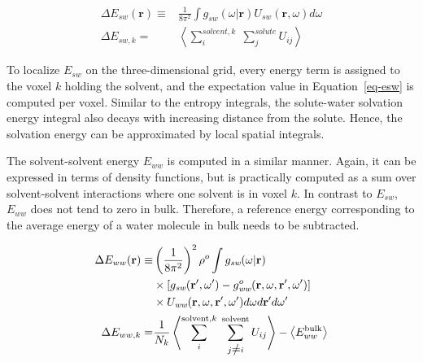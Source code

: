 \documentclass[9pt,tutorial]{livecoms}
\renewcommand{\neq}{\setbox0\hbox{=}\rlap{\hbox to \wd0{\hss /\hss}}\box0}
\begin{document}
\begin{equation}
\begin{aligned}
\label{eq-esw}
	\Delta E_{sw}(\textbf{r}) \equiv& \frac{1}{8\pi^2} \int g_\textit{sw}\left(\omega|\textbf{r}\right) U_\textit{sw}\left(\textbf{r}, \omega\right) d\omega \\
	\Delta E_{sw,k}=& \left\langle \sum_i^{\textit{solvent},k} \; \sum_j^\textit{solute} U_{ij}\right\rangle
\end{aligned}
\end{equation}

To localize $E_{sw}$ on the three-dimensional grid, every energy term is assigned to the voxel $k$ holding the solvent, and the expectation value in Equation~\ref{eq-esw} is computed per voxel.
Similar to the entropy integrals, the solute-water solvation energy integral also decays with increasing distance from the solute. Hence, the solvation energy can be approximated by local spatial integrals. 

The solvent-solvent energy $E_{ww}$ is computed in a similar manner.
Again, it can be expressed in terms of density functions, but is practically computed as a sum over solvent-solvent interactions where one solvent is in voxel $k$.
In contrast to $E_{sw}$, $E_{ww}$ does not tend to zero in bulk.
Therefore, a reference energy corresponding to the average energy of a water molecule in bulk needs to be subtracted.


\begin{equation}
\begin{aligned}
	\Delta E_{ww}(\textbf{r}) \equiv & \left(\frac{1}{8\pi^2} \right)^2 \rho^o \int g_\textit{sw}(\omega|\textbf{r}) \\
	& \times \left[g_\textit{sw}(\textbf{r}^\prime , \omega^\prime) - g^o_\textit{ww} (\textbf{r}, \omega, \textbf{r}^\prime, \omega^\prime )\right] \\
	& \times U_\textit{ww}(\textbf{r}, \omega, \textbf{r}^\prime, \omega^\prime)d\omega d\textbf{r}^\prime d\omega^\prime \\
	\Delta E_{ww,k} =& \frac{1}{N_k} \left\langle \sum_i^{\text{solvent},k} \; \sum_{j \neq i}^\text{solvent} U_{ij}\right\rangle - \left\langle E_{ww}^\text{bulk}\right\rangle
\end{aligned}
\end{equation}
\end{document}
